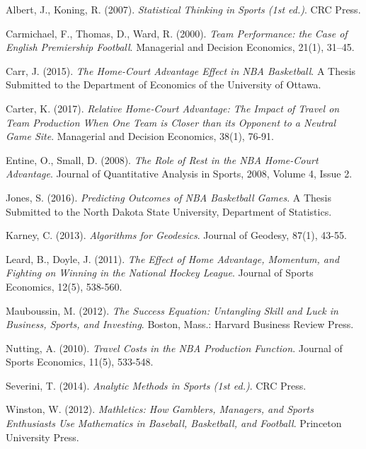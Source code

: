 \documentclass[
    12pt,
    a4paper,
    titlepage,  %
    abstract,  %
    headings=standardclasses,  %
    bibliography=totocnumbered  %
]{scrartcl}
\begin{document}
\begin{thebibliography}{Mauboussin 2012}
Albert, J., Koning, R. (2007). \textsl{Statistical Thinking in Sports (1st ed.)}. CRC Press.

Carmichael, F., Thomas, D., Ward, R. (2000). \textsl{Team Performance: the Case of English Premiership Football}. Managerial and Decision Economics, 21(1), 31–45.

Carr, J. (2015). \textsl{The Home-Court Advantage Effect in NBA Basketball}. A Thesis Submitted to the Department of Economics of the University of Ottawa.

Carter, K. (2017). \textsl{Relative Home‐Court Advantage: The Impact of Travel on Team Production When One Team is Closer than its Opponent to a Neutral Game Site}. Managerial and Decision Economics, 38(1), 76-91.

Entine, O., Small, D. (2008). \textsl{The Role of Rest in the NBA Home-Court Advantage}. Journal of Quantitative Analysis in Sports, 2008, Volume 4, Issue 2.

Jones, S. (2016). \textsl{Predicting Outcomes of NBA Basketball Games}. A Thesis Submitted to the North Dakota State University, Department of Statistics.

Karney, C. (2013). \textsl{Algorithms for Geodesics}. Journal of Geodesy, 87(1), 43-55.

Leard, B., Doyle, J. (2011). \textsl{The Effect of Home Advantage, Momentum, and Fighting on Winning in the National Hockey League}. Journal of Sports Economics, 12(5), 538-560.

Mauboussin, M. (2012). \textsl{The Success Equation: Untangling Skill and Luck in Business, Sports, and Investing}. Boston, Mass.: Harvard Business Review Press.

Nutting, A. (2010). \textsl{Travel Costs in the NBA Production Function}. Journal of Sports Economics, 11(5), 533-548.

Severini, T. (2014). \textsl{Analytic Methods in Sports (1st ed.)}. CRC Press.

Winston, W. (2012). \textsl{Mathletics: How Gamblers, Managers, and Sports Enthusiasts Use Mathematics in Baseball, Basketball, and Football}. Princeton University Press.

\end{thebibliography}
\end{document}
